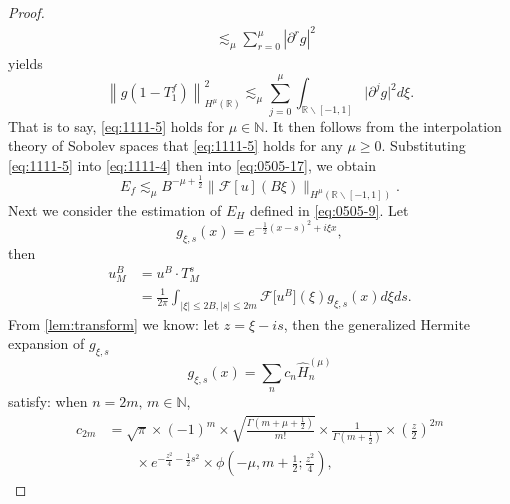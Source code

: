 \documentclass[pdflatex,sn-aps]{sn-jnl}%
\theoremstyle{thmstyleone}%
\theoremstyle{thmstyletwo}%
\theoremstyle{thmstylethree}%
\begin{document}
\begin{proof}
\begin{equation}
\begin{aligned}
    & \lesssim_\mu \sum_{r=0}^\mu\left|\partial^r g\right|^2
    \end{aligned}
  \end{equation}
  yields
  \begin{equation}\label{eq:1111-8}
    \left\|g\left(1-T_1^f\right)\right\|_{H^\mu(\mathbb{R})}^2 \lesssim_\mu \sum_{j=0}^\mu \int_{\mathbb{R} \backslash[-1,1]}\bigl|\partial^j g\bigr|^2 d \xi.
  \end{equation}
  That is to say, \eqref{eq:1111-5} holds for $\mu \in \mathbb{N}$.
  It then follows from the interpolation theory of Sobolev spaces that \eqref{eq:1111-5} holds for any $\mu \geqslant 0$.
  Substituting \eqref{eq:1111-5} into \eqref{eq:1111-4} then into \eqref{eq:0505-17}, we obtain
  \begin{equation}\label{eq:1111-9}
    E_f \lesssim_\mu B^{-\mu+\frac{1}{2}} \bigl\|\mathcal{F}[u](B \xi)\bigr\|_{H^{\mu}\left(\mathbb{R}\backslash [-1,1]\right)}.
  \end{equation}
  Next we consider the estimation of $E_H$ defined in \eqref{eq:0505-9}.
  Let
  \begin{equation}\label{eq:0505-33}
    g_{\xi, s}(x)=e^{-\frac{1}{2}(x-s)^2+i \xi x},
  \end{equation}
  then
  \begin{equation}\label{eq:0505-34}
    \begin{aligned}
    u_M^B & =u^B \cdot T_M^s \\
    & =\frac{1}{2 \pi} \int_{|\xi| \leqslant 2 B,|s| \leqslant 2 m} \mathcal{F}\bigl[u^B\bigr](\xi) g_{\xi, s}(x) d \xi d s.
    \end{aligned}
  \end{equation}
  From \ref{lem:transform} we know:
  let $z = \xi - is$, then the generalized Hermite expansion of $g_{\xi,s}$
  \begin{equation}\label{eq:0505-35}
    g_{\xi, s}(x)=\sum_n c_n \widehat{H}_n^{(\mu)}
  \end{equation}
  satisfy: when $n = 2m,\, m \in \mathbb{N}$,
  \begin{equation}\label{eq:0505-36}
    \begin{aligned}
    c_{2 m} & =\sqrt{\pi} \times(-1)^m \times \sqrt{\frac{\Gamma\left(m+\mu+\frac{1}{2}\right)}{m!}} \times \frac{1}{\Gamma\left(m+\frac{1}{2}\right)} \times\left(\frac{z}{2}\right)^{2 m} \\
    &{}\qquad \times e^{-\frac{z^2}{4}-\frac{1}{2} s^2} \times \phi\left(-\mu, m+\frac{1}{2} ; \frac{z^2}{4}\right),
    \end{aligned}

\end{equation}
\end{proof}
\end{document}
